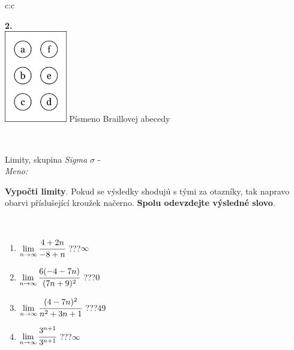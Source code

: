 \documentclass[10pt]{report}
\begin{document}
\begin{tabular}{c:c}
\begin{minipage}[c][104.5mm][t]{0.5\linewidth}
\begin{center}
\begin{minipage}{0.20\linewidth}
\begin{center}
{\Huge\bfseries 2.} \\[2mm]
\includegraphics[height=40mm]{../images/braille.png}
{\small Písmeno Braillovej abecedy}
\end{center}
\end{minipage}
\end{center}
\end{minipage}
\\ \hdashline
\begin{minipage}[c][104.5mm][t]{0.5\linewidth}
\begin{center}
\vspace{7mm}
{\huge Limity, skupina \textit{Sigma $\sigma$} -}\\[5mm]
\textit{Meno:}\phantom{xxxxxxxxxxxxxxxxxxxxxxxxxxxxxxxxxxxxxxxxxxxxxxxxxxxxxxxxxxxxxxxxx}\\[5mm]
\begin{minipage}{0.95\linewidth}
\begin{center}
\textbf{Vypočti limity}. Pokud se výsledky shodujú s tými za otazníky, tak napravo\\obarvi příslušející kroužek načerno. \textbf{Spolu odevzdejte výsledné slovo}.
\end{center}
\end{minipage}
\\[1mm]
\begin{minipage}{0.79\linewidth}
\begin{center}
\begin{varwidth}{\linewidth}
\begin{enumerate}
\normalsize
\item $\lim\limits_{n\to\infty}\cfrac{4+2n}{-8+n}$\quad \dotfill\; ???\;\dotfill \quad $\infty$
\item $\lim\limits_{n\to\infty}\cfrac{6(-4-7n)}{(7n+9)^2}$\quad \dotfill\; ???\;\dotfill \quad $0$
\item $\lim\limits_{n\to\infty}\cfrac{(4-7n)^2}{n^2+3n+1}$\quad \dotfill\; ???\;\dotfill \quad $49$
\item $\lim\limits_{n\to\infty}\cfrac{3^{n+1}}{3^{n+1}}$\quad \dotfill\; ???\;\dotfill \quad $\infty$

\end{enumerate}
\end{varwidth}
\end{center}
\end{minipage}
\end{center}
\end{minipage}
\end{tabular}
\end{document}
